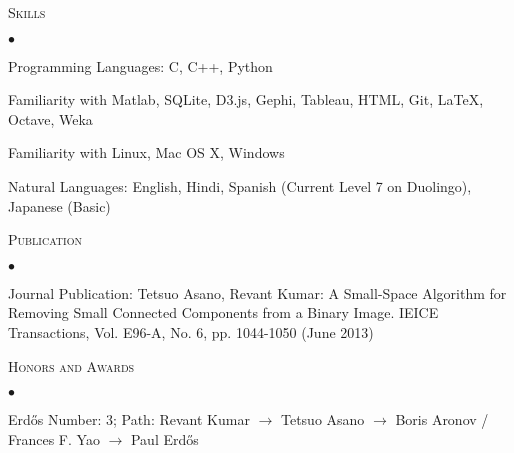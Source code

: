 \documentclass[10pt]{article}
\newcommand{\lineunder}{\\\vspace{-9pt}\hrulefill}
\newcommand{\header}[1]{{\normalsize\scshape{#1}} \lineunder}
\newenvironment{achievements}{\begin{list}{$\bullet$}{\topsep 0pt \itemsep 0pt}}{\end{list}}
\begin{document}
\vspace{3pt}

\header{Skills}
\begin{achievements}
\item Programming Languages: C, C++, Python
\item Familiarity with Matlab, SQLite, D3.js, Gephi, Tableau, HTML, Git, \LaTeX, Octave, Weka%
\item Familiarity with Linux, Mac OS X, Windows
\item Natural Languages: English, Hindi, Spanish (Current Level 7 on Duolingo), Japanese (Basic)
\end{achievements}
	
\vspace{3pt}
	
\header{Publication}%
\begin{achievements}
\item Journal Publication: Tetsuo Asano, Revant Kumar: A Small-Space Algorithm for Removing Small Connected Components from a Binary Image. IEICE Transactions, Vol. E96-A, No. 6, pp. 1044-1050 (June 2013)
\end{achievements} 

\vspace{3pt}

\header{Honors and Awards}
\begin{achievements}
\item Erd\H{o}s Number: 3; Path: Revant Kumar $\rightarrow$ Tetsuo Asano $\rightarrow$ Boris Aronov / Frances F. Yao $\rightarrow$ Paul Erd\H{o}s
\end{achievements}
\end{document}
